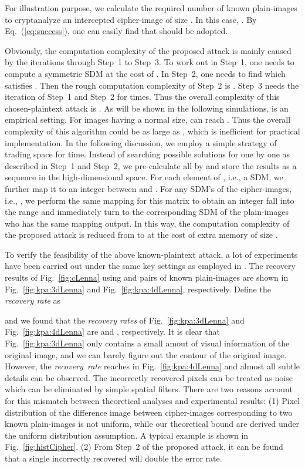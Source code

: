 \documentclass[smallextended, final]{svjour3}          \smartqed
\begin{document}
For illustration purpose, we calculate the required number of known plain-images to cryptanalyze an intercepted cipher-image of size .
In this case, . By Eq.~(\ref{eq:success}), one can easily find that  should be adopted.



Obviously, the computation complexity of the proposed attack is mainly caused by the iterations through Step~1 to Step~3.
To work out  in Step~1, one needs to compute a symmetric SDM at the cost of . In Step~2, one needs to find  which satisfies
. Then the rough computation complexity of Step~2 is . Step~3 needs the iteration of Step~1 and Step~2 for  times.
Thus the overall complexity of this chosen-plaintext attack is . As will be shown in the following simulations,  is an empirical setting.
For images having a normal size,  can reach . Thus the overall complexity of this algorithm could be as large as , which is inefficient for practical
implementation. In the following discussion, we employ a simple strategy of trading space for time.
Instead of searching possible solutions for  one by one as described in Step~1 and Step~2, we pre-calculate all  by 
and store the results as a sequence in the high-dimensional space. For each element of , i.e., a SDM, we further map it to an integer between  and .
For any SDM's of the cipher-images, i.e., , we perform the same mapping for this matrix to obtain an integer fall into the range  and immediately turn to the corresponding
SDM of the plain-images who has the same mapping output. In this way, the computation complexity of the proposed attack is reduced from   to  at the cost
of extra memory of size .

To verify the feasibility of the above known-plaintext attack, a lot of experiments have been carried out under the same key settings as employed in \cite[Sec.~4.1]{li2012image}.
The recovery results of Fig.~\ref{fig:cLenna} using  and  pairs of known plain-images are shown in Fig.~\ref{fig:kpa:3dLenna} and Fig.~\ref{fig:kpa:4dLenna},
respectively. Define the \textit{recovery rate} as

and we found that the \textit{recovery rates} of Fig.~\ref{fig:kpa:3dLenna} and Fig.~\ref{fig:kpa:4dLenna} are   and , respectively.
It is clear that Fig.~\ref{fig:kpa:3dLenna} only contains a small amout of visual information of the original image, and we can barely figure out the contour of the original image.
However, the \textit{recovery~rate} reaches  in Fig.~\ref{fig:kpa:4dLenna} and almost all subtle details can be observed.
The incorrectly recovered pixels can be treated as noise which can be eliminated by simple spatial filters. There are two reasons account for this mismatch between theoretical analyses and
experimental results: (1) Pixel distribution of the difference image between cipher-images corresponding to two known plain-images is not uniform, while our theoretical bound
are derived under the uniform distribution assumption. A typical example is shown in Fig.~\ref{fig:histCipher}.
(2) From Step~2 of the proposed attack, it can be found that a single incorrectly recovered  will double the error rate.
\end{document}
